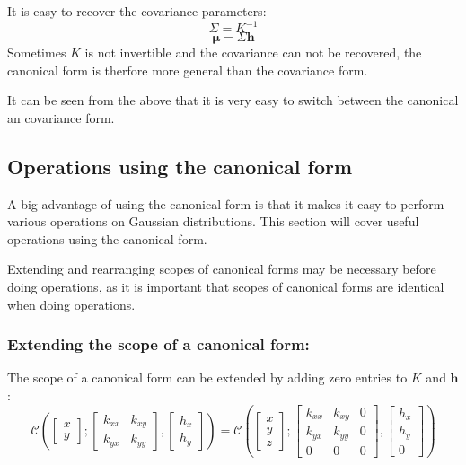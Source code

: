 \documentclass[12pt,oneside,openany,a4paper, %
afrikaans,english,
]{memoir}
\numberwithin{equation}{chapter}
\begin{document}
It is easy to recover the covariance parameters:
\begin{equation}
\Sigma = K^{-1}
\end{equation}
\begin{equation}
\bm{\mu} = \Sigma\bm{h}
\end{equation}
Sometimes $K$ is not invertible and the covariance can not be recovered, the canonical form is therfore more general than the covariance form.

It can be seen from the above that it is very easy to switch between the canonical an covariance form. 
\subsection{Operations using the canonical form}
A big advantage of using the canonical form is that it makes it easy to perform various operations on Gaussian distributions. This section will cover useful operations using the canonical form. 

Extending and rearranging scopes of canonical forms may be necessary before doing operations, as it is important that scopes of canonical forms are identical when doing operations. 
\subsubsection{Extending the scope of a canonical form:}
The scope of a canonical form can be extended by adding zero entries to $K$ and $\bm{h}$:
\begin{equation}
\mathcal{C}\left(
\begin{bmatrix}
x\\
y
\end{bmatrix};
\begin{bmatrix}
k_{xx} & k_{xy}\\
k_{yx} & k_{yy}
\end{bmatrix},
\begin{bmatrix}
h_x\\
h_y
\end{bmatrix}
\right)
=
\mathcal{C}\left(
\begin{bmatrix}
x\\
y\\
z
\end{bmatrix};
\begin{bmatrix}
k_{xx} & k_{xy} & 0\\
k_{yx} & k_{yy} & 0\\
0 & 0 & 0
\end{bmatrix},
\begin{bmatrix}
h_x\\
h_y\\
0
\end{bmatrix}
\right)
\end{equation}
\end{document}
